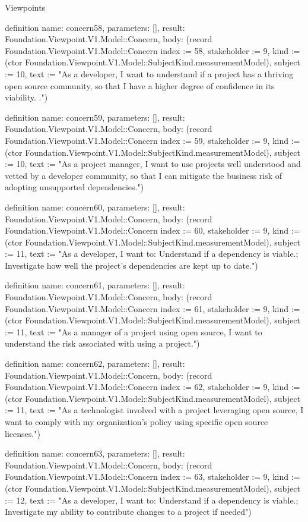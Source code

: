 \begin{lexlean}{Viewpoints}
\begin{semanticmodule}
definition{
  name: concern58,
  parameters: [],
  result: Foundation.Viewpoint.V1.Model::Concern,
  body: (record Foundation.Viewpoint.V1.Model::Concern {index := 58, stakeholder := 9, kind := (ctor Foundation.Viewpoint.V1.Model::SubjectKind.measurementModel), subject := 10, text := "As a developer, I want to understand if a project has a thriving open source community, so that I have a higher degree of confidence in its viability. ."})
}

definition{
  name: concern59,
  parameters: [],
  result: Foundation.Viewpoint.V1.Model::Concern,
  body: (record Foundation.Viewpoint.V1.Model::Concern {index := 59, stakeholder := 9, kind := (ctor Foundation.Viewpoint.V1.Model::SubjectKind.measurementModel), subject := 10, text := "As a project manager, I want to use projects well understood and vetted by a developer community, so that I can mitigate the business risk of adopting unsupported dependencies."})
}

definition{
  name: concern60,
  parameters: [],
  result: Foundation.Viewpoint.V1.Model::Concern,
  body: (record Foundation.Viewpoint.V1.Model::Concern {index := 60, stakeholder := 9, kind := (ctor Foundation.Viewpoint.V1.Model::SubjectKind.measurementModel), subject := 11, text := "As a developer, I want to: Understand if a dependency is viable.; Investigate how well the project’s dependencies are kept up to date."})
}

definition{
  name: concern61,
  parameters: [],
  result: Foundation.Viewpoint.V1.Model::Concern,
  body: (record Foundation.Viewpoint.V1.Model::Concern {index := 61, stakeholder := 9, kind := (ctor Foundation.Viewpoint.V1.Model::SubjectKind.measurementModel), subject := 11, text := "As a manager of a project using open source, I want to understand the risk associated with using a project."})
}

definition{
  name: concern62,
  parameters: [],
  result: Foundation.Viewpoint.V1.Model::Concern,
  body: (record Foundation.Viewpoint.V1.Model::Concern {index := 62, stakeholder := 9, kind := (ctor Foundation.Viewpoint.V1.Model::SubjectKind.measurementModel), subject := 11, text := "As a technologist involved with a project leveraging open source, I want to comply with my organization’s policy using specific open source licenses."})
}

definition{
  name: concern63,
  parameters: [],
  result: Foundation.Viewpoint.V1.Model::Concern,
  body: (record Foundation.Viewpoint.V1.Model::Concern {index := 63, stakeholder := 9, kind := (ctor Foundation.Viewpoint.V1.Model::SubjectKind.measurementModel), subject := 12, text := "As a developer, I want to: Understand if a dependency is viable.; Investigate my ability to contribute changes to a project if needed"})
}


\end{semanticmodule}
\end{lexlean}
